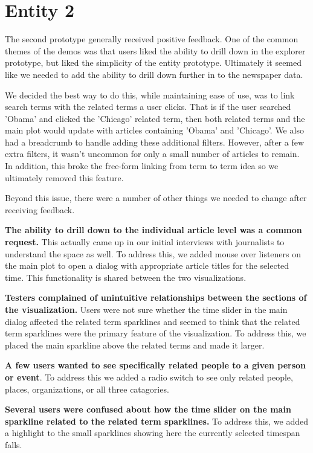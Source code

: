 \section{Entity 2}

The second prototype generally received positive feedback. One of the common themes of the demos was that users liked the ability to drill down in the explorer prototype, but liked the simplicity of the entity prototype. Ultimately it seemed like we needed to add the ability to drill down further in to the newspaper data.

We decided the best way to do this, while maintaining ease of use, was to link search terms with the related terms a user clicks. That is if the user searched 'Obama' and clicked the 'Chicago' related term, then both related terms and the main plot would update with articles containing 'Obama' and 'Chicago'. We also had a breadcrumb to handle adding these additional filters. However, after a few extra filters, it wasn't uncommon for only a small number of articles to remain. In addition, this broke the free-form linking from term to term idea so we ultimately removed this feature.

Beyond this issue, there were a number of other things we needed to change after receiving feedback.

\textbf{The ability to drill down to the individual article level was a common request.} This actually came up in our initial interviews with journalists to understand the space as well. To address this, we added mouse over listeners on the main plot to open a dialog with appropriate article titles for the selected time. This functionality is shared between the two visualizations.

\textbf{Testers complained of unintuitive relationships between the sections of the visualization.} Users were not sure whether the time slider in the main dialog affected the related term sparklines and seemed to think that the related term sparklines were the primary feature of the visualization. To address this, we placed the main sparkline above the related terms and made it larger.

\textbf{A few users wanted to see specifically related people to a given person or event}. To address this we added a radio switch to see only related people, places, organizations, or all three catagories.

\textbf{Several users were confused about how the time slider on the main sparkline related to the related term sparklines.} To address this, we added a highlight to the small sparklines showing here the currently selected timespan falls. 

